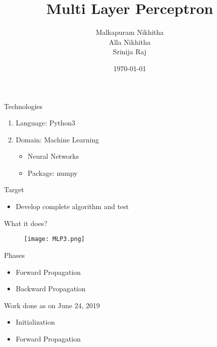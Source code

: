 \documentclass{beamer}
\title{Multi Layer Perceptron }
\author{ Malkapuram Nikhitha \\ Alla Nikhitha \\ Srinija Raj}
\institute[WE]{ TalentSprint - WE program }
\date{\today}
\begin{document}
\begin{frame}
  \titlepage
\end{frame}

\begin{frame}{Technologies}
    \begin{enumerate}
        \item Language: Python3
        \vspace{20pt}
        \item  Domain: Machine Learning
            \vspace{10pt}
            \begin{itemize}
                \item Neural Networks
                \vspace{10pt}
                \item Package: numpy
            \end{itemize}
    \end{enumerate}
\end{frame}

\begin{frame}{Target}
\begin{itemize}
  \item Develop complete algorithm and test  
\end{itemize}
\end{frame}

\begin{frame}{What it does?}
\begin{figure}
    \texttt{[image: MLP3.png]}
\end{figure}
\end{frame}
    
\begin{frame}{Phases}
    \begin{itemize}
        \item Forward Propagation
        \vspace{20pt}
        \item Backward Propagation
    \end{itemize}
\end{frame}
    
\begin{frame}{Work done as on June 24, 2019}
    \begin{itemize}
        \item Initialization
        \vspace{20pt}
        \item Forward Propagation
    \end{itemize}
\end{frame}
\end{document}

